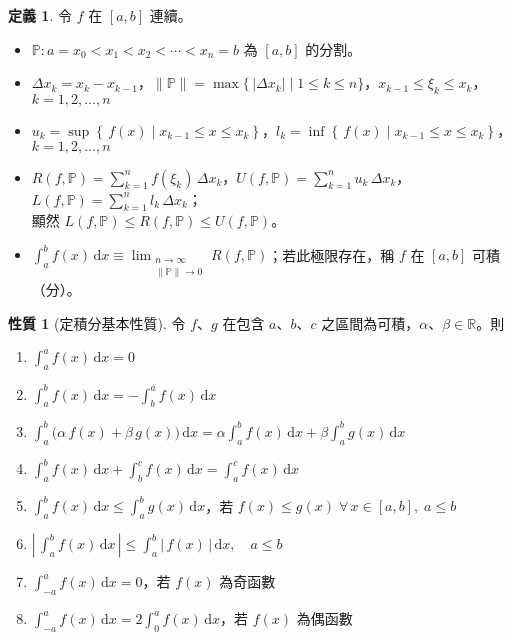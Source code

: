 \documentclass[12pt]{extarticle}
\newcommand{\ds}{\displaystyle}
\theoremstyle{definition}
\newtheorem*{dfn}{定義}
\newtheorem*{prp}{性質}
\begin{document}
\begin{dfn}
  令 $f$ 在 $[a,b]$ 連續。
  \begin{itemize}\setlength\itemsep{0em}
    \item $\ds\mathbb{P}: a = x_0 < x_1 < x_2 < \cdots < x_n = b$ 為 $[a, b]$ 的分割。
    \item $\ds\Delta x_k=x_k - x_{k-1}$，$\ds\|\mathbb{P}\| = \max\{\,|\Delta x_k|\;|\;1\leqslant k\leqslant n\}$，$\ds x_{k-1}\leqslant \xi_k \leqslant x_k$，$k=1,2,\ldots,n$
    \item $\ds u_k = \sup\left\{\,f(x)\;|\;x_{k-1}\leqslant x\leqslant x_k\right\}$，$l_k = \inf\left\{\,f(x)\;|\;x_{k-1}\leqslant x\leqslant x_k\right\}$，$k=1,2,\ldots,n$
    \item $\ds R(f,\mathbb{P}) = \sum_{k=1}^n f(\xi_k)\,\Delta x_k$，$\ds U(f,\mathbb{P}) = \sum_{k=1}^n u_k\,\Delta x_k$，$\ds L(f,\mathbb{P}) = \sum_{k=1}^n l_k\,\Delta x_k$；\\顯然 $\ds L(f,\mathbb{P})\leqslant R(f,\mathbb{P})\leqslant U(f, \mathbb{P})$。
    \item $\ds\int_a^b f(x)\,\mathrm{d}x\equiv\lim_{\substack{n\to\infty \\ \|\mathbb{P}\|\to 0}} R(f,\mathbb{P})$；若此極限存在，稱 $f$ 在 $[a, b]$ 可積（分）。
  \end{itemize}
\end{dfn}

\begin{prp}[定積分基本性質]
  令 $f$、$g$ 在包含 $a$、$b$、$c$ 之區間為可積，$\alpha$、$\beta\in\mathbb{R}$。則
  \begin{enumerate}\setlength\itemsep{0em}
    \item $\ds\int_a^a f(x)\,\mathrm{d}x = 0$
    \item $\ds\int_a^b f(x)\,\mathrm{d}x = -\int_b^a f(x)\,\mathrm{d}x$
    \item $\ds\int_a^b \big(\alpha\,f(x) + \beta\,g(x)\big)\,\mathrm{d}x = \alpha\int_a^b f(x)\,\mathrm{d}x + \beta\int_a^b g(x)\,\mathrm{d}x$
    \item $\ds\int_a^b f(x)\,\mathrm{d}x + \int_b^c f(x)\,\mathrm{d}x = \int_a^c f(x)\,\mathrm{d}x$
    \item $\ds\int_a^b f(x)\,\mathrm{d}x\leqslant\int_a^b g(x)\,\mathrm{d}x$，若 $f(x)\leqslant g(x)\;\forall\,x\in[a, b],\;a\leqslant b$
    \item $\ds\left|\,\int_a^b f(x)\,\mathrm{d}x\,\right|\leqslant \int_a^b \left|\,f(x)\,\right|\,\mathrm{d}x, \quad a\leqslant b$ 
    \item $\ds\int_{-a}^a f(x)\,\mathrm{d}x = 0$，若 $f(x)$ 為奇函數
    \item $\ds\int_{-a}^a f(x)\,\mathrm{d}x = 2\int_0^a f(x)\,\mathrm{d}x$，若 $f(x)$ 為偶函數
  \end{enumerate}
\end{prp}
\end{document}
